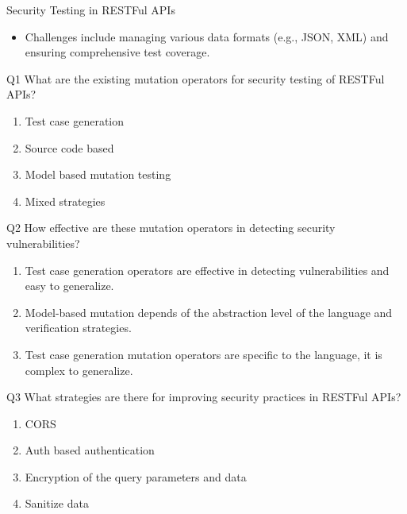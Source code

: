 \documentclass[12pt]{beamer}
\theoremstyle{remark}
\theoremstyle{definition}
\begin{document}
\begin{frame}[allowframebreaks]
\begin{block}{Security Testing in RESTFul APIs}
\begin{itemize}
\begin{itemize}
    \end{itemize}
    \item Challenges include managing various data formats (e.g., JSON, XML) and ensuring comprehensive test coverage.
\end{itemize}
\end{block}
\pagebreak
\begin{block}{Q1}
     What are the existing mutation operators for security testing of RESTFul APIs?
     \begin{enumerate}
      \item Test case generation
      \item Source code based
      \item Model based mutation testing
      \item Mixed strategies
  \end{enumerate}
\end{block}
\pagebreak
\begin{block}{Q2}
    How effective are these mutation operators in detecting security vulnerabilities?
  \begin{enumerate}
    \item Test case generation operators are effective in detecting vulnerabilities and easy to generalize.
    \item Model-based mutation depends of the abstraction level of the language and verification strategies.
    \item Test case generation mutation operators are specific to the language, it is complex to generalize.
  \end{enumerate}
\end{block}
\pagebreak
\begin{block}{Q3}
    What strategies are there for improving security practices in RESTFul APIs?
    \begin{enumerate}
      \item CORS
      \item Auth based authentication
      \item Encryption of the query parameters and data
      \item Sanitize data

\end{enumerate}
\end{block}
\end{frame}
\end{document}
